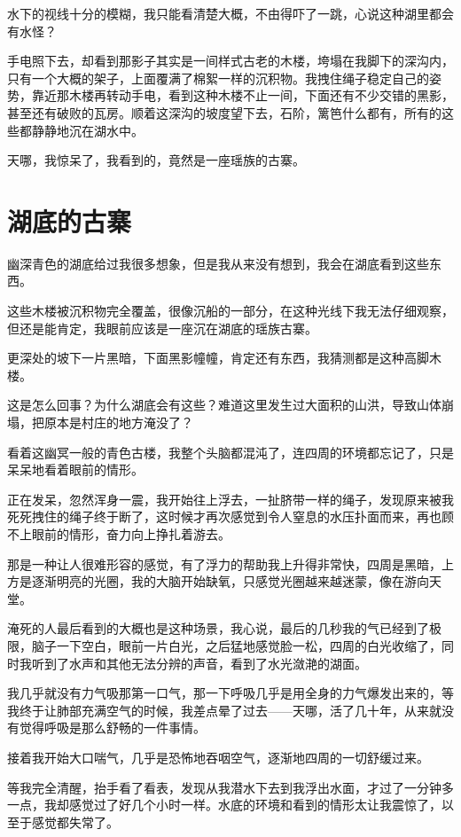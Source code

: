 水下的视线十分的模糊，我只能看清楚大概，不由得吓了一跳，心说这种湖里都会有水怪？

手电照下去，却看到那影子其实是一间样式古老的木楼，垮塌在我脚下的深沟内，只有一个大概的架子，上面覆满了棉絮一样的沉积物。我拽住绳子稳定自己的姿势，靠近那木楼再转动手电，看到这种木楼不止一间，下面还有不少交错的黑影，甚至还有破败的瓦房。顺着这深沟的坡度望下去，石阶，篱笆什么都有，所有的这些都静静地沉在湖水中。

天哪，我惊呆了，我看到的，竟然是一座瑶族的古寨。

\chapter{湖底的古寨}

幽深青色的湖底给过我很多想象，但是我从来没有想到，我会在湖底看到这些东西。

这些木楼被沉积物完全覆盖，很像沉船的一部分，在这种光线下我无法仔细观察，但还是能肯定，我眼前应该是一座沉在湖底的瑶族古寨。

更深处的坡下一片黑暗，下面黑影幢幢，肯定还有东西，我猜测都是这种高脚木楼。

这是怎么回事？为什么湖底会有这些？难道这里发生过大面积的山洪，导致山体崩塌，把原本是村庄的地方淹没了？

看着这幽冥一般的青色古楼，我整个头脑都混沌了，连四周的环境都忘记了，只是呆呆地看着眼前的情形。

正在发呆，忽然浑身一震，我开始往上浮去，一扯脐带一样的绳子，发现原来被我死死拽住的绳子终于断了，这时候才再次感觉到令人窒息的水压扑面而来，再也顾不上眼前的情形，奋力向上挣扎着游去。

那是一种让人很难形容的感觉，有了浮力的帮助我上升得非常快，四周是黑暗，上方是逐渐明亮的光圈，我的大脑开始缺氧，只感觉光圈越来越迷蒙，像在游向天堂。

淹死的人最后看到的大概也是这种场景，我心说，最后的几秒我的气已经到了极限，脑子一下空白，眼前一片白光，之后猛地感觉脸一松，四周的白光收缩了，同时我听到了水声和其他无法分辨的声音，看到了水光潋滟的湖面。

我几乎就没有力气吸那第一口气，那一下呼吸几乎是用全身的力气爆发出来的，等我终于让肺部充满空气的时候，我差点晕了过去——天哪，活了几十年，从来就没有觉得呼吸是那么舒畅的一件事情。

接着我开始大口喘气，几乎是恐怖地吞咽空气，逐渐地四周的一切舒缓过来。

等我完全清醒，抬手看了看表，发现从我潜水下去到我浮出水面，才过了一分钟多一点，我却感觉过了好几个小时一样。水底的环境和看到的情形太让我震惊了，以至于感觉都失常了。

